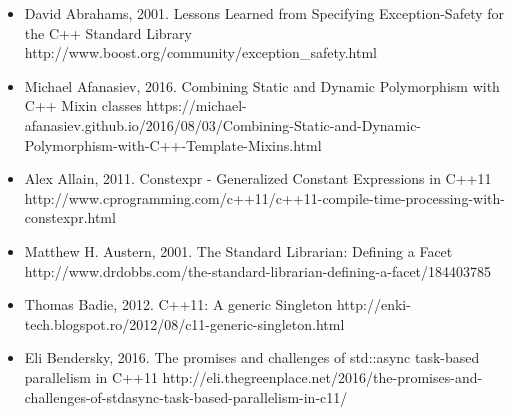 \begin{itemize}
\item David Abrahams, 2001. Lessons Learned from Specifying Exception-Safety for the C++ Standard Library http://\allowbreak{}www.\allowbreak{}boost.\allowbreak{}org/\allowbreak{}community/\allowbreak{}exception\_\allowbreak{}safety.\allowbreak{}html



\item Michael Afanasiev, 2016. Combining Static and Dynamic Polymorphism with C++ Mixin classes https://\allowbreak{}michael-\allowbreak{}afanasiev.\allowbreak{}github.\allowbreak{}io/\allowbreak{}2016/\allowbreak{}08/\allowbreak{}03/\allowbreak{}Combining-\allowbreak{}Static-\allowbreak{}and-\allowbreak{}Dynamic-\allowbreak{}Polymorphism-\allowbreak{}with-\allowbreak{}C++-\allowbreak{}Template-\allowbreak{}Mixins.\allowbreak{}html



\item Alex Allain, 2011. Constexpr - Generalized Constant Expressions in C++11 http://\allowbreak{}www.\allowbreak{}cprogramming.\allowbreak{}com/\allowbreak{}c++11/\allowbreak{}c++11-\allowbreak{}compile-\allowbreak{}time-\allowbreak{}processing-\allowbreak{}with-\allowbreak{}constexpr.\allowbreak{}html



\item Matthew H. Austern, 2001. The Standard Librarian: Defining a Facet http://\allowbreak{}www.\allowbreak{}drdobbs.\allowbreak{}com/\allowbreak{}the-\allowbreak{}standard-\allowbreak{}librarian-\allowbreak{}defining-\allowbreak{}a-\allowbreak{}facet/\allowbreak{}184403785



\item Thomas Badie, 2012. C++11: A generic Singleton http://\allowbreak{}enki-\allowbreak{}tech.\allowbreak{}blogspot.\allowbreak{}ro/\allowbreak{}2012/\allowbreak{}08/\allowbreak{}c11-\allowbreak{}generic-\allowbreak{}singleton.\allowbreak{}html



\item Eli Bendersky, 2016. The promises and challenges of std::async task-based parallelism in C++11 http://\allowbreak{}eli.\allowbreak{}thegreenplace.\allowbreak{}net/\allowbreak{}2016/\allowbreak{}the-\allowbreak{}promises-\allowbreak{}and-\allowbreak{}challenges-\allowbreak{}of-\allowbreak{}stdasync-\allowbreak{}task-\allowbreak{}based-\allowbreak{}parallelism-\allowbreak{}in-\allowbreak{}c11/



\end{itemize}
